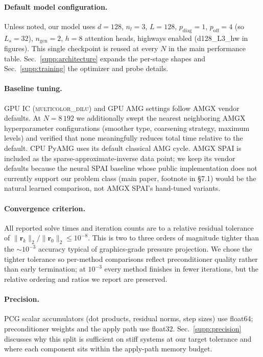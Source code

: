 \documentclass[acmtog]{acmart}
\begin{document}
\paragraph{Default model configuration.}
Unless noted, our model uses $d\!=\!128$, $n_l\!=\!3$, $L\!=\!128$,
$p_{\mathrm{diag}}\!=\!1$, $p_{\mathrm{off}}\!=\!4$ (so $L_s\!=\!32$),
$n_{\mathrm{gcn}}\!=\!2$, $h\!=\!8$ attention heads, highways enabled
(\textsf{d128\_L3\_hw} in figures). This single checkpoint is reused at every $N$
in the main performance table. Sec.~\ref{supp:architecture} expands the per-stage
shapes and Sec.~\ref{supp:training} the optimizer and probe details.

\paragraph{Baseline tuning.}
GPU IC (\textsc{multicolor\_dilu}) and GPU AMG settings follow AMGX vendor
defaults. At $N\!=\!8\,192$ we additionally swept the nearest neighboring AMGX
hyperparameter configurations (smoother type, coarsening strategy, maximum levels)
and verified that none meaningfully reduces total time relative to the default.
CPU PyAMG uses its default classical AMG cycle. AMGX SPAI is included as the
sparse-approximate-inverse data point; we keep its vendor defaults because the
neural SPAI baseline whose public implementation does not currently support our
problem class (main paper, footnote in \S7.1) would be the natural learned
comparison, not AMGX SPAI's hand-tuned variants.

\paragraph{Convergence criterion.}
All reported solve times and iteration counts are to a relative residual tolerance
of $\|\mathbf{r}_k\|_2 / \|\mathbf{r}_0\|_2 \!\le\! 10^{-8}$. This is two to three
orders of magnitude tighter than the $\sim\!10^{-3}$ accuracy typical of
graphics-grade pressure projection. We chose the tighter tolerance so per-method
comparisons reflect preconditioner quality rather than early termination; at
$10^{-3}$ every method finishes in fewer iterations, but the relative ordering and
ratios we report are preserved.

\paragraph{Precision.}
PCG scalar accumulators (dot products, residual norms, step sizes) use float64;
preconditioner weights and the apply path use float32. Sec.~\ref{supp:precision}
discusses why this split is sufficient on stiff systems at our target tolerance
and where each component sits within the apply-path memory budget.
\end{document}
